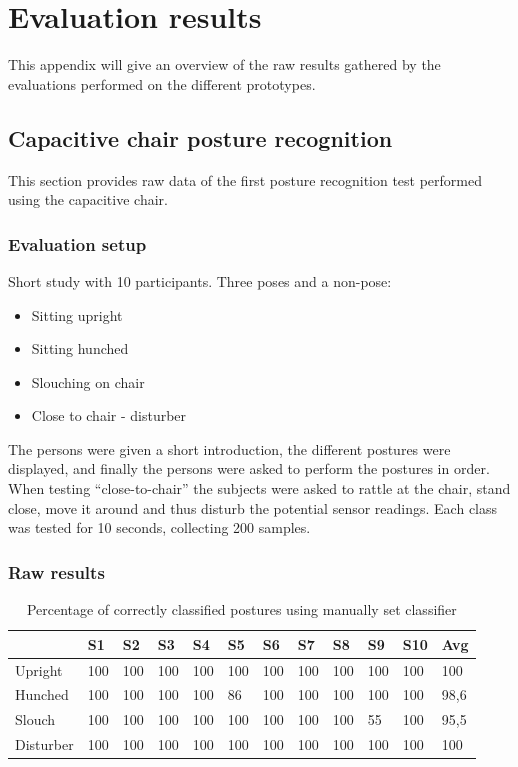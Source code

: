 \chapter{Evaluation results}
This appendix will give an overview of the raw results gathered by the evaluations performed on the different prototypes.
\section{Capacitive chair posture recognition}
\label{ch:app_capchair_eval}
This section provides raw data of the first posture recognition test performed using the capacitive chair. 
\subsection{Evaluation setup}
Short study with 10 participants. Three poses and a non-pose:
\begin{itemize}
\item Sitting upright
\item Sitting hunched
\item Slouching on chair
\item Close to chair - disturber
\end{itemize}

The persons were given a short introduction, the different postures were displayed, and finally the persons were asked to perform the postures in order. When testing “close-to-chair” the subjects were asked to rattle at the chair, stand close, move it around and thus disturb the potential sensor readings. Each class was tested for 10 seconds, collecting 200 samples. 

\subsection{Raw results}
\begin{table}[htbp]
  \centering
  \caption{Percentage of correctly classified postures using manually set classifier}
    \begin{tabularx}{\linewidth}{XXXXXXXXXXXX}
    \toprule
          & S1    & S2    & S3    & S4    & S5    & S6    & S7    & S8    & S9    & S10   & Avg \\
    \midrule
    Upright & 100   & 100   & 100   & 100   & 100   & 100   & 100   & 100   & 100   & 100   & 100 \\
    Hunched & 100   & 100   & 100   & 100   & 86    & 100   & 100   & 100   & 100   & 100   & 98,6 \\
    Slouch & 100   & 100   & 100   & 100   & 100   & 100   & 100   & 100   & 55    & 100   & 95,5 \\
    Disturber & 100   & 100   & 100   & 100   & 100   & 100   & 100   & 100   & 100   & 100   & 100 \\
    \bottomrule
    \end{tabularx}%
  \label{tab:app_eval_chair_raw1}%
\end{table}%
